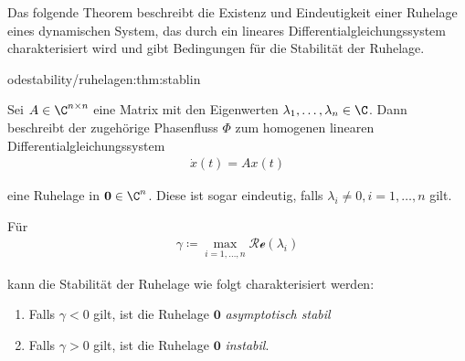 \documentclass[letterpaper,10pt,german]{jupyterBook}
\begin{document}
\par
Das folgende Theorem beschreibt die Existenz und Eindeutigkeit einer Ruhelage eines dynamischen System, das durch ein lineares Differentialgleichungssystem charakterisiert wird und gibt Bedingungen für die Stabilität der Ruhelage.
\begin{theorem}{}{odestability/ruhelagen:thm:stablin}



\par
Sei \(A\in \C^{n\times n}\) eine Matrix mit den Eigenwerten \(\lambda_1,\dots, \lambda_n\in \C\).
Dann beschreibt der zugehörige Phasenfluss \(\Phi\) zum homogenen linearen Differentialgleichungssystem
\begin{align*}
\dot{x}(t) = Ax(t)
\end{align*}
\par
eine Ruhelage in \(\mathbf{0} \in \C^n\).
Diese ist sogar eindeutig, falls \(\lambda_i\neq 0, i=1,\ldots,n\) gilt.

\par
Für
\begin{align*}
\gamma \coloneqq \max_{i=1,\dots,n} \mathcal{Re}(\lambda_i)
\end{align*}
\par
kann die Stabilität der Ruhelage wie folgt charakterisiert werden:
\begin{enumerate}

\item {} 
\par
Falls \(\gamma <0\) gilt, ist die Ruhelage \(\mathbf{0}\) \emph{asymptotisch stabil}

\item {} 
\par
Falls \(\gamma >0\) gilt, ist die Ruhelage \(\mathbf{0}\) \emph{instabil}.

\end{enumerate}
\end{theorem}
\end{document}
